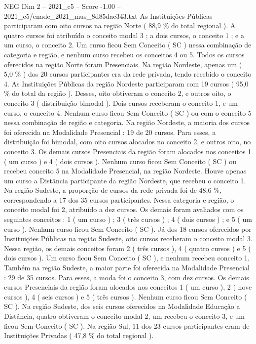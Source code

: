 \begin{textsample}{NEG Dim 2 – 2021\_c5 – Score -1.00 – 2021\_c5/enade\_2021\_mus\_8d85dac343.txt}
As Instituições Públicas participaram com oito cursos na região Norte ( 88,9 \% do total regional ).
A quatro cursos foi atribuído o conceito modal 3 ; a dois cursos, o conceito 1 ; e a um curso, o conceito 2.
Um curso ficou Sem Conceito ( SC ) nessa combinação de categoria e região, e nenhum curso recebeu os conceitos 4 ou 5.
Todos os cursos oferecidos na região Norte foram Presenciais.
Na região Nordeste, apenas um ( 5,0 \% ) dos 20 cursos participantes era da rede privada, tendo recebido o conceito 4.
As Instituições Públicas da região Nordeste participaram com 19 cursos ( 95,0 \% do total da região ).
Desses, oito obtiveram o conceito 2, e outros oito, o conceito 3 ( distribuição bimodal ).
Dois cursos receberam o conceito 1, e um curso, o conceito 4.
Nenhum curso ficou Sem Conceito ( SC ) ou com o conceito 5 nessa combinação de região e categoria.
Na região Nordeste, a maioria dos cursos foi oferecida na Modalidade Presencial : 19 de 20 cursos.
Para esses, a distribuição foi bimodal, com oito cursos alocados no conceito 2, e outros oito, no conceito 3.
Os demais cursos Presenciais da região foram alocados nos conceitos 1 ( um curso ) e 4 ( dois cursos ).
Nenhum curso ficou Sem Conceito ( SC ) ou recebeu conceito 5 na Modalidade Presencial, na região Nordeste.
Houve apenas um curso a Distância participante da região Nordeste, que recebeu o conceito 1.
Na região Sudeste, a proporção de cursos da rede privada foi de 48,6 \%, correspondendo a 17 dos 35 cursos participantes.
Nessa categoria e região, o conceito modal foi 2, atribuído a dez cursos.
Os demais foram avaliados com os seguintes conceitos : 1 ( um curso ) ; 3 ( três cursos ) ; 4 ( dois cursos ) ; e 5 ( um curso ).
Nenhum curso ficou Sem Conceito ( SC ).
Já dos 18 cursos oferecidos por Instituições Públicas na região Sudeste, oito cursos receberam o conceito modal 3.
Nessa região, os demais conceitos foram 2 ( três cursos ), 4 ( quatro cursos ) e 5 ( dois cursos ).
Um curso ficou Sem Conceito ( SC ), e nenhum recebeu conceito 1.
Também na região Sudeste, a maior parte foi oferecida na Modalidade Presencial : 29 de 35 cursos.
Para esses, a moda foi o conceito 3, com dez cursos.
Os demais cursos Presenciais da região foram alocados nos conceitos 1 ( um curso ), 2 ( nove cursos ), 4 ( seis cursos ) e 5 ( três cursos ).
Nenhum curso ficou Sem Conceito ( SC ).
Na região Sudeste, dos seis cursos oferecidos na Modalidade Educação a Distância, quatro obtiveram o conceito modal 2, um recebeu o conceito 3, e um ficou Sem Conceito ( SC ).
Na região Sul, 11 dos 23 cursos participantes eram de Instituições Privadas ( 47,8 \% do total regional ).

\end{textsample}
